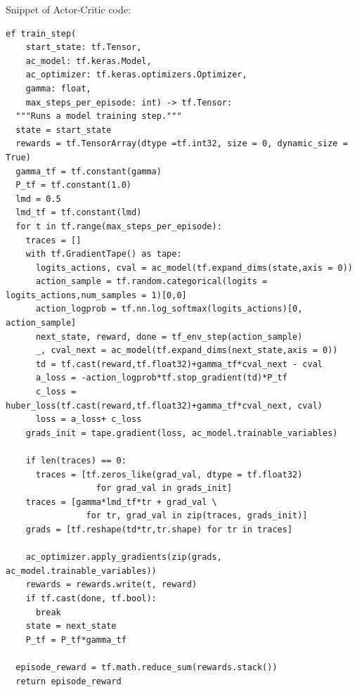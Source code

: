\documentclass{article}[12pt]
\begin{document}
Snippet of Actor-Critic code:
\begin{lstlisting}
ef train_step(
    start_state: tf.Tensor, 
    ac_model: tf.keras.Model, 
    ac_optimizer: tf.keras.optimizers.Optimizer, 
    gamma: float, 
    max_steps_per_episode: int) -> tf.Tensor:
  """Runs a model training step."""
  state = start_state
  rewards = tf.TensorArray(dtype =tf.int32, size = 0, dynamic_size = True)
  gamma_tf = tf.constant(gamma)
  P_tf = tf.constant(1.0)
  lmd = 0.5
  lmd_tf = tf.constant(lmd)
  for t in tf.range(max_steps_per_episode):
    traces = [] 
    with tf.GradientTape() as tape:
      logits_actions, cval = ac_model(tf.expand_dims(state,axis = 0))
      action_sample = tf.random.categorical(logits = logits_actions,num_samples = 1)[0,0]
      action_logprob = tf.nn.log_softmax(logits_actions)[0, action_sample]
      next_state, reward, done = tf_env_step(action_sample)
      _, cval_next = ac_model(tf.expand_dims(next_state,axis = 0))
      td = tf.cast(reward,tf.float32)+gamma_tf*cval_next - cval
      a_loss = -action_logprob*tf.stop_gradient(td)*P_tf
      c_loss = huber_loss(tf.cast(reward,tf.float32)+gamma_tf*cval_next, cval)
      loss = a_loss+ c_loss
    grads_init = tape.gradient(loss, ac_model.trainable_variables)
    
    if len(traces) == 0:
      traces = [tf.zeros_like(grad_val, dtype = tf.float32)
                  for grad_val in grads_init]
    traces = [gamma*lmd_tf*tr + grad_val \
                for tr, grad_val in zip(traces, grads_init)]
    grads = [tf.reshape(td*tr,tr.shape) for tr in traces]

    ac_optimizer.apply_gradients(zip(grads, ac_model.trainable_variables))
    rewards = rewards.write(t, reward)
    if tf.cast(done, tf.bool):
      break
    state = next_state
    P_tf = P_tf*gamma_tf

  episode_reward = tf.math.reduce_sum(rewards.stack())
  return episode_reward
\end{lstlisting}
\end{document}
